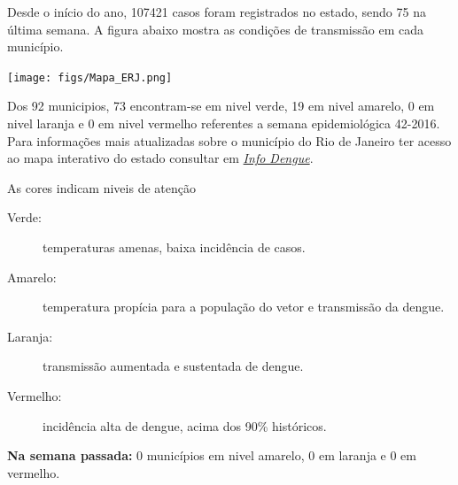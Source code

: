 \documentclass[10pt]{article} %
\begin{document}
\begin{minipage}[t]{.66\linewidth} %

\hypertarget{estado}{} %

Desde o início do ano, 107421 casos foram registrados no estado, sendo 75 na última semana. A figura abaixo mostra as condições de transmissão em cada município.

\texttt{[image: figs/Mapa\_ERJ.png]}

Dos 92 municipios, 73 encontram-se em nivel verde, 19 em nivel amarelo, 0 em nivel laranja e 0 em nivel vermelho referentes a semana epidemiológica 42-2016. Para informações mais atualizadas
sobre o município do Rio de Janeiro ter acesso ao mapa interativo do estado consultar em \href{http://info.dengue.mat.br}{\textit{Info Dengue}}.


\vspace{1cm}
\begin{mdframed}[style=intextbox,frametitle={}] %

\hypertarget{descriptivebox}{} %
As cores indicam niveis de atenção
\begin{description}
\item[Verde:] temperaturas amenas, baixa incidência de casos.      
\item[Amarelo:] temperatura propícia para a população do vetor e transmissão da dengue.
\item[Laranja:] transmissão aumentada e sustentada de dengue. 
\item[Vermelho:] incidência alta de dengue, acima dos 90\% históricos.
\end{description}
\end{mdframed}

 \textbf{Na semana passada:} 0 municípios em nivel amarelo, 0 em laranja e 0 em vermelho.    

\end{minipage} %
\end{document}
